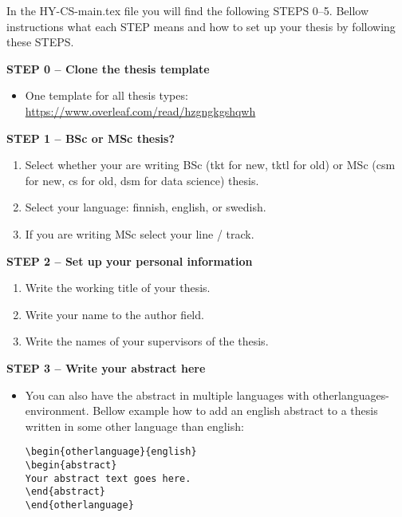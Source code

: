 


In the HY-CS-main.tex file you will find the following STEPS 0--5. Bellow instructions what each STEP means and how to set up your thesis by following these STEPS.
\vspace{0.5cm}

\textbf{STEP 0 -- Clone the thesis template}

\begin{itemize}
\item One template for all thesis types: \url{https://www.overleaf.com/read/hzgngkgshqwh}
\end{itemize}


{\textbf{STEP 1 -- BSc or MSc thesis?}}
\begin{enumerate}
\item Select whether your are writing BSc (tkt for new, tktl for old) or MSc (csm for new, cs for old, dsm for data science) thesis.
\item Select your language: finnish, english, or swedish.
\item If you are writing MSc select your line / track.
\end{enumerate}


{\textbf{STEP 2 -- Set up your personal information}}

\begin{enumerate}
\item Write the working title of your thesis.
\item Write your name to the author field.
\item Write the names of your supervisors of the thesis.
\end{enumerate}

{\textbf{STEP 3 -- Write your abstract here}}

\begin{itemize}
\item You can also have the abstract in multiple languages with otherlanguages-environment. Bellow example how to add an english abstract to a thesis written in some other language than english: 

\begin{verbatim}
\begin{otherlanguage}{english} 
\begin{abstract}
Your abstract text goes here. 
\end{abstract} 
\end{otherlanguage}
\end{verbatim}

\end{itemize}

